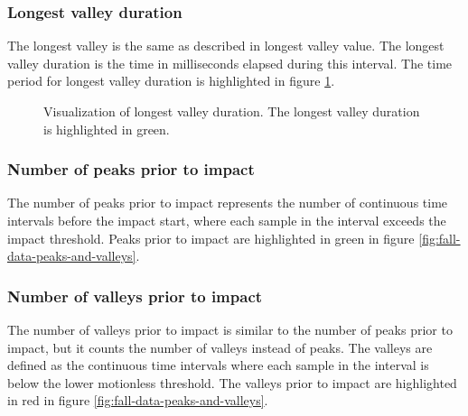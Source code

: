 \documentclass[12pt, a4paper, onecolumn]{article}
\begin{document}
	\subsubsection{Longest valley duration}
	
	The longest valley is the same as described in longest valley value. The longest valley duration is the time in milliseconds elapsed during this interval. The time period for longest valley duration is highlighted in figure \ref{fig:fall-data-longest-valley-duration}.
	
	\begin{figure}[H]
		\centering
		\caption{Visualization of longest valley duration. The longest valley duration is highlighted in green.}%
		\label{fig:fall-data-longest-valley-duration}%
	\end{figure}
	
	\subsubsection{Number of peaks prior to impact}
	
	The number of peaks prior to impact represents the number of continuous time intervals before the impact start, where each sample in the interval exceeds the impact threshold. Peaks prior to impact are highlighted in green in figure \ref{fig:fall-data-peaks-and-valleys}.
	
	\subsubsection{Number of valleys prior to impact}
	
	The number of valleys prior to impact is similar to the number of peaks prior to impact, but it counts the number of valleys instead of peaks. The valleys are defined as the continuous time intervals where each sample in the interval is below the lower motionless threshold. The valleys prior to impact are highlighted in red in figure \ref{fig:fall-data-peaks-and-valleys}.
	
\end{document}
